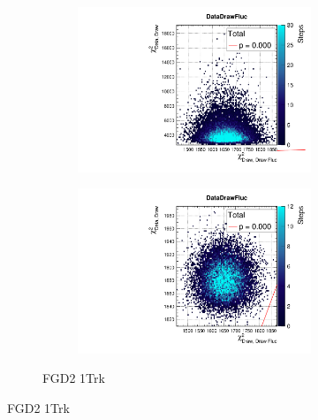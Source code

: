 \begin{figure}[h]
\begin{subfigure}[t]{\textwidth}
\begin{subfigure}[t]{0.24\textwidth}
\includegraphics[width=\textwidth, trim={0mm 0mm 0mm 8mm}, clip,page=119]{figures/mach3/data/priorpred/2017b_NewDet_3Xsec_4Det_5Flux_NewXSecTune_Data_merge_PriorPred_procs}
\end{subfigure}
\begin{subfigure}[t]{0.24\textwidth}
	\includegraphics[width=\textwidth, trim={0mm 0mm 0mm 8mm}, clip,page=119]{figures/mach3/data/postpred/2017b_NewData_NewDet_UpdXsecStep_2Xsec_4Det_5Flux_0_PostPred_procs}
\end{subfigure}
\caption{FGD2 1Trk \numubar}
\end{subfigure}


\end{figure}
